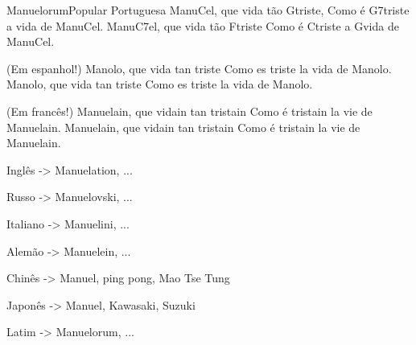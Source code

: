 \begin{musica}{Manuelorum}{Popular Portuguesa}{}
Manu\ac{C}{el}, que vida tão \ac{G}{tris}te,
Como é \ac{G7}{tris}te a vida de Manu\ac{C}{el}.
Manu\ac{C7}{el}, que vida tão \ac{F}{tris}te
Como é \ac{C}{tris}te a \ac{G}{vi}da de Manu\ac{C}{el}.

(Em espanhol!)
Manolo, que vida tan triste
Como es triste la vida de Manolo.
Manolo, que vida tan triste
Como es triste la vida de Manolo.

(Em francês!)
Manuelain, que vidain tan tristain
Como é tristain la vie de Manuelain.
Manuelain, que vidain tan tristain
Como é tristain la vie de Manuelain.

Inglês -> Manuelation, ...

Russo -> Manuelovski, ...

Italiano -> Manuelini, ...

Alemão -> Manuelein, ...

Chinês -> Manuel, ping pong, Mao Tse Tung

Japonês -> Manuel, Kawasaki, Suzuki

Latim -> Manuelorum, ...

\end{musica}
